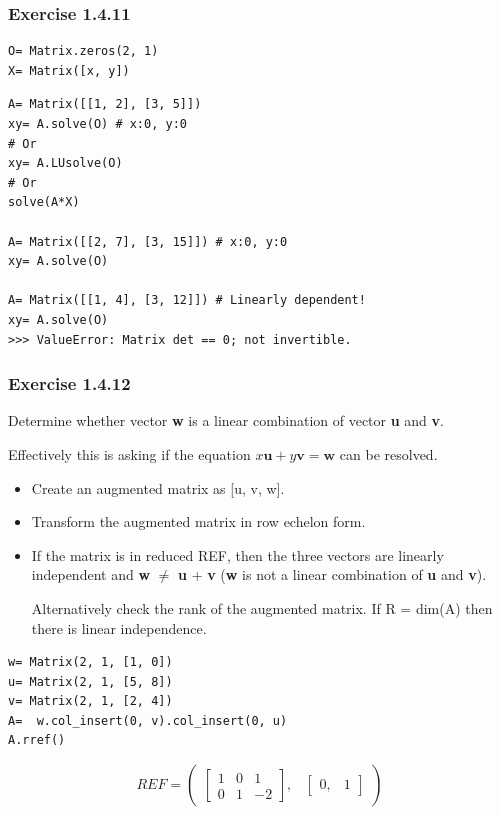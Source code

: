 \documentclass[a4paper]{article}
\begin{document}
\subsubsection{Exercise 1.4.11}

\begin{verbatim}
O= Matrix.zeros(2, 1)
X= Matrix([x, y])
\end{verbatim}

\begin{verbatim}
A= Matrix([[1, 2], [3, 5]])
xy= A.solve(O) # x:0, y:0
# Or
xy= A.LUsolve(O) 
# Or
solve(A*X)

A= Matrix([[2, 7], [3, 15]]) # x:0, y:0
xy= A.solve(O)

A= Matrix([[1, 4], [3, 12]]) # Linearly dependent!
xy= A.solve(O)
>>> ValueError: Matrix det == 0; not invertible.
\end{verbatim}

\subsubsection{Exercise 1.4.12}

Determine whether vector \textbf{w} is a linear combination of vector \textbf{u}
and \textbf{v}.

Effectively this is asking if the equation $x\mathbf{u} + y\mathbf{v} = \mathbf{w}$
can be resolved.


\begin{itemize}
\item Create an augmented matrix as [u, v, w].
\item Transform the augmented matrix in row echelon form.
\item If the matrix is in reduced REF, then the three vectors are linearly
independent and \textbf{w} $\neq$ \textbf{u} + \textbf{v} (\textbf{w} is not a linear
combination of \textbf{u} and \textbf{v}).

Alternatively check the rank of the augmented matrix. If R = dim(A) then there is
linear independence.
\end{itemize}

\begin{verbatim}
w= Matrix(2, 1, [1, 0])
u= Matrix(2, 1, [5, 8])
v= Matrix(2, 1, [2, 4])
A=  w.col_insert(0, v).col_insert(0, u)
A.rref()
\end{verbatim}

\begin{equation}
REF= \begin{pmatrix}\left[\begin{matrix}1 & 0 & 1\\0 & 1 & -2\end{matrix}\right], & \begin{bmatrix}0, & 1\end{bmatrix}\end{pmatrix}
\end{equation}
\end{document}
